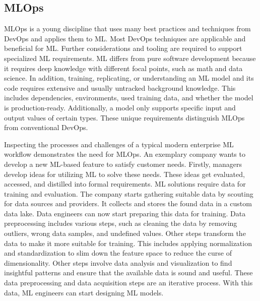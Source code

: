 \subsection{MLOps}

MLOps is a young discipline that uses many best practices and techniques from DevOps and applies them to ML.
Most DevOps techniques are applicable and beneficial for ML.
Further considerations and tooling are required to support specialized ML requirements.
ML differs from pure software development because it requires deep knowledge with different focal points, such as math and data science.
In addition, training, replicating, or understanding an ML model and its code requires extensive and usually untracked background knowledge.
This includes dependencies, environments, used training data, and whether the model is production-ready.
Additionally, a model only supports specific input and output values of certain types.
These unique requirements distinguish MLOps from conventional DevOps.

Inspecting the processes and challenges of a typical modern enterprise ML workflow demonstrates the need for MLOps.
An exemplary company wants to develop a new ML-based feature to satisfy customer needs.
Firstly, managers develop ideas for utilizing ML to solve these needs.
These ideas get evaluated, accessed, and distilled into formal requirements.
ML solutions require data for training and evaluation.
The company starts gathering suitable data by scouting for data sources and providers.
It collects and stores the found data in a custom data lake.
Data engineers can now start preparing this data for training.
Data preprocessing includes various steps, such as cleaning the data by removing outliers, wrong data samples, and undefined values.
Other steps transform the data to make it more suitable for training.
This includes applying normalization and standardization to slim down the feature space to reduce the curse of dimensionality.
Other steps involve data analysis and visualization to find insightful patterns and ensure that the available data is sound and useful.
These data preprocessing and data acquisition steps are an iterative process.
With this data, ML engineers can start designing ML models.

